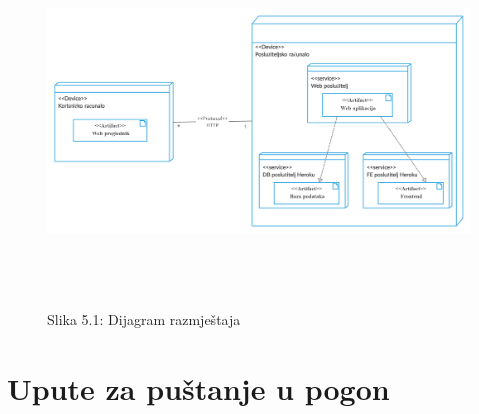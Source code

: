 		
		
		\begin{figure}[h]
			\includegraphics[height=                       9cm,width=1\textwidth]{dijagrami/Dijagram_razmjestaja.png}
			\begin{center}
				Slika 5.1: Dijagram razmještaja
			\end{center}
		\end{figure}
		
		\eject	
		
		
		\section{Upute za puštanje u pogon}

